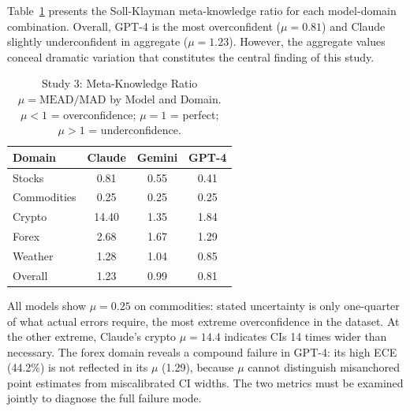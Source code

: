 Table~\ref{tab:mead} presents the Soll-Klayman meta-knowledge ratio for each
model-domain combination. Overall, GPT-4 is the most overconfident ($\mu = 0.81$)
and Claude slightly underconfident in aggregate ($\mu = 1.23$). However, the
aggregate values conceal dramatic variation that constitutes the central finding
of this study.

\begin{table}[ht]
  \centering
  \caption{Study 3: Meta-Knowledge Ratio $\mu = \text{MEAD}/\text{MAD}$ by Model and Domain.
    $\mu < 1$ = overconfidence; $\mu = 1$ = perfect; $\mu > 1$ = underconfidence.}
  \label{tab:mead}
  \begin{tabular}{lccc}
    \toprule
    Domain       & Claude & Gemini & GPT-4 \\
    \midrule
    Stocks       & 0.81   & 0.55   & 0.41  \\
    Commodities  & 0.25   & 0.25   & 0.25  \\
    Crypto       & 14.40  & 1.35   & 1.84  \\
    Forex        & 2.68   & 1.67   & 1.29  \\
    Weather      & 1.28   & 1.04   & 0.85  \\
    \midrule
    Overall      & 1.23   & 0.99   & 0.81  \\
    \bottomrule
  \end{tabular}
\end{table}

All models show $\mu = 0.25$ on commodities: stated uncertainty is only one-quarter
of what actual errors require, the most extreme overconfidence in the dataset. At the
other extreme, Claude's crypto $\mu = 14.4$ indicates CIs 14 times wider than
necessary. The forex domain reveals a compound failure in GPT-4: its high ECE
(44.2\%) is not reflected in its $\mu$ (1.29), because $\mu$ cannot distinguish
misanchored point estimates from miscalibrated CI widths. The two metrics must
be examined jointly to diagnose the full failure mode.
